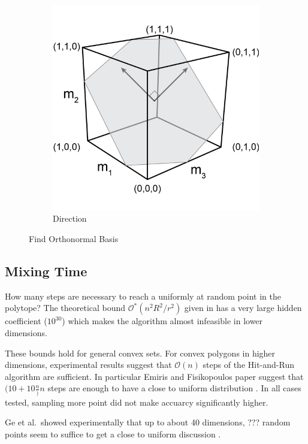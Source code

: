 \begin{figure}
\begin{subfigure}[b]{0.25\textwidth}
                \includegraphics[width=\textwidth]{orthobasis.png}
     \caption{Direction}
      \label{Orthonormal Basis}        
      \end{subfigure}
      \caption{Find Orthonormal Basis}\label{fig_basis} 
\end{figure}


\subsection{Mixing Time}
How many steps are necessary to reach a uniformly at random point in the polytope? The theoretical bound $\mathcal{O}^*(n^2R^2/r^2)$ given in \cite{Lovasz} has a very large hidden coefficient ($10^30$) which makes the algorithm almost infeasible in lower dimensions.

These bounds hold for general convex sets. For convex polygons in higher dimensions, experimental results suggest that $\mathcal{O}(n)$ steps of the Hit-and-Run algorithm are sufficient. In particular Emiris and Fisikopoulos paper suggest that $(10 + 10\frac{n})n$ steps are enough to have a close to uniform distribution \cite{Emiris}. In all cases tested, sampling more point did not make accuarcy significantly higher. 

Ge et al.\ showed experimentally that up to about 40 dimensions, ??? random points seem to suffice to get a close to uniform discussion \cite{Ge}. 

